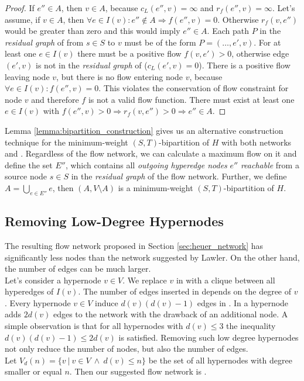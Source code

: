 \begin{proof}
If $e'' \in A$, then $v \in A$, because $c_L(e'',v) = \infty$ and $r_f(e'',v) = \infty$.
Let's assume, if $v \in A$, then $\forall e \in I(v): e'' \notin A \Rightarrow f(e'',v) = 0$. 
Otherwise $r_f(v, e'')$ would be greater than zero and this would imply $e'' \in A$. Each path 
$P$ in the \emph{residual graph} of  from $s \in S$ to $v$ must be of the 
form $P = (\ldots,e',v)$. For at least one $e \in I(v)$ there must be a positive flow $f(v,e') > 0$,
otherwise edge $(e',v)$ is not in the \emph{residual graph} of  ($c_L(e',v) = 0$).
There is a positive flow leaving node $v$, but there is no flow entering node $v$, because
$\forall e \in I(v): f(e'',v) = 0$. This violates the conservation of flow
constraint for node $v$ and therefore $f$ is not a valid flow function. There must exist at least one $e \in I(v)$
with $f(e'',v) > 0 \Rightarrow r_f(v,e'') > 0 \Rightarrow e'' \in A$.
\end{proof}

Lemma \ref{lemma:bipartition_construction} gives us an alternative construction technique for the minimum-weight $(S,T)$-bipartition
of $H$ with both networks  and . Regardless of the flow network, we can 
calculate a maximum flow on it and define the set $E''$, which contains all \emph{outgoing hyperedge
nodes} $e''$ \emph{reachable} from a source node $s \in S$ in the \emph{residual graph} of the flow network. 
Further, we define $A = \bigcup_{e \in E''} e$, then $(A,V\setminus A)$ is a 
minimum-weight $(S,T)$-bipartition of $H$.


\subsection{Removing Low-Degree Hypernodes}
\label{sec:degree_network}

The resulting flow network  proposed in Section \ref{sec:heuer_network} has significantly
less nodes than the network  suggested by Lawler. On the other hand, the number of
edges can be much larger. \\
Let's consider a hypernode $v \in V$. We replace $v$ in  with a clique between all
hyperedges of $I(v)$. The number of edges inserted in  depends on the degree of
$v$. Every hypernode $v \in V$ induce $d(v)(d(v) - 1)$ edges in . In  a hypernode adds $2d(v)$ edges to the network with the drawback
of an additional node. A simple observation is that for all hypernodes with $d(v) \le 3$ the inequality
$d(v)(d(v) - 1) \le 2d(v)$ is satisfied. Removing such low degree hypernodes not only reduce
the number of nodes, but also the number of edges. \\
Let $V_{d}(n) = \{v\ |\ v \in V\ \land\ d(v) \le n\}$ be the set of all hypernodes
with degree smaller or equal $n$. Then our suggested flow network is .

